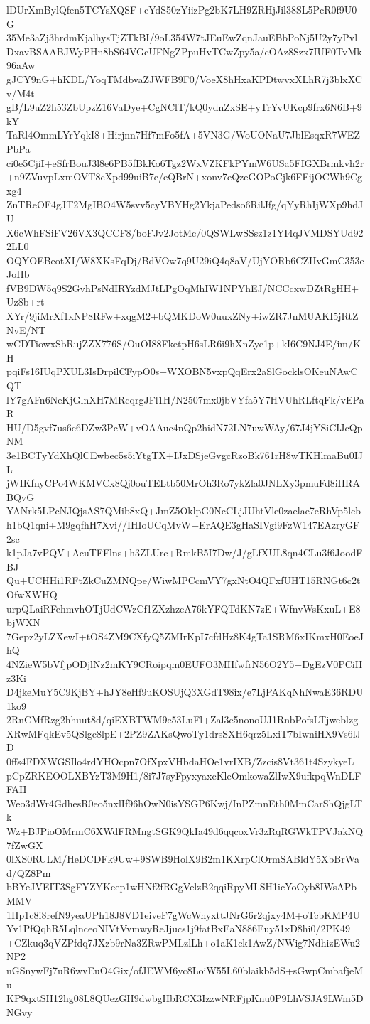 lDUrXmBylQfen5TCYsXQSF+cYdS50zYiizPg2bK7LH9ZRHjJil38SL5PcR0f9U0G
35Me3aZj3hrdmKjalhysTjZTkBI/9oL354W7tJEuEwZqnJauEBbPoNj5U2y7yPvl
DxavBSAABJWyPHn8bS64VGcUFNgZPpuHvTCwZpy5a/cOAz8Szx7IUF0TvMk96aAw
gJCY9nG+hKDL/YoqTMdbvaZJWFB9F0/VoeX8hHxaKPDtwvxXLhR7j3blxXCv/M4t
gB/L9uZ2h53ZbUpzZ16VaDye+CgNClT/kQ0ydnZxSE+yTrYvUKcp9frx6N6B+9kY
TaRl4OmmLYrYqkI8+Hirjnn7Hf7mFo5fA+5VN3G/WoUONaU7JblEsqxR7WEZPbPa
ci0e5CjiI+eSfrBouJ3l8e6PB5fBkKo6Tgz2WxVZKFkPYmW6USa5FIGXBrmkvh2r
+n9ZVuvpLxmOVT8cXpd99uiB7e/eQBrN+xonv7eQzeGOPoCjk6FFijOCWh9Cgxg4
ZnTReOF4gJT2MgIBO4W5svv5cyVBYHg2YkjaPedso6RilJfg/qYyRhIjWXp9hdJU
X6cWhFSiFV26VX3QCCF8/boFJv2JotMc/0QSWLwSSsz1z1YI4qJVMDSYUd922LL0
OQYOEBeotXI/W8XKsFqDj/BdVOw7q9U29iQ4q8aV/UjYORb6CZIIvGmC353eJoHb
fVB9DW5q9S2GvhPsNdIRYzdMJtLPgOqMhIW1NPYhEJ/NCCcxwDZtRgHH+Uz8b+rt
XYr/9jiMrXf1xNP8RFw+xqgM2+bQMKDoW0uuxZNy+iwZR7JnMUAKI5jRtZNvE/NT
wCDTiowxSbRujZZX776S/OuOI88FketpH6sLR6i9hXnZye1p+kI6C9NJ4E/im/KH
pqiFs16IUqPXUL3IsDrpilCFypO0s+WXOBN5vxpQqErx2aSlGocklsOKeuNAwCQT
lY7gAFn6NeKjGlnXH7MRcqrgJFl1H/N2507mx0jbVYfa5Y7HVUhRLftqFk/vEPaR
HU/D5gvf7us6c6DZw3PcW+vOAAuc4nQp2hidN72LN7uwWAy/67J4jYSiCIJcQpNM
3e1BCTyYdXhQlCEwbec5s5iYtgTX+IJxDSjeGvgcRzoBk761rH8wTKHlmaBu0IJL
jWIKfnyCPo4WKMVCx8Qj0ouTELtb50MrOh3Ro7ykZla0JNLXy3pmuFd8iHRABQvG
YANrk5LPcNJQjsAS7QMib8xQ+JmZ5OklpG0NcCLjJUhtVle0zaelae7eRhVp5lcb
h1bQ1qni+M9gqfhH7Xvi//IHIoUCqMvW+ErAQE3gHaSIVgi9FzW147EAzryGF2sc
k1pJa7vPQV+AcuTFFlns+h3ZLUrc+RmkB5I7Dw/J/gLfXUL8qn4CLu3f6JoodFBJ
Qu+UCHHi1RFtZkCuZMNQpe/WiwMPCcmVY7gxNtO4QFxfUHT15RNGt6c2tOfwXWHQ
urpQLaiRFehmvhOTjUdCWzCf1ZXzhzcA76kYFQTdKN7zE+WfnvWsKxuL+E8bjWXN
7Gepz2yLZXewI+tOS4ZM9CXfyQ5ZMIrKpI7cfdHz8K4gTa1SRM6xIKmxH0EoeJhQ
4NZieW5bVfjpODjlNz2mKY9CRoipqm0EUFO3MHfwfrN56O2Y5+DgEzV0PCiHz3Ki
D4jkeMuY5C9KjBY+hJY8eHf9uKOSUjQ3XGdT98ix/e7LjPAKqNhNwaE36RDU1ko9
2RnCMfRzg2hhuut8d/qiEXBTWM9e53LuFl+Zal3e5nonoUJ1RnbPofsLTjweblzg
XRwMFqkEv5QSlgc8lpE+2PZ9ZAKsQwoTy1drsSXH6qrz5LxiT7bIwniHX9Vs6lJD
0ffs4FDXWGSIlo4rdYHOcpn7OfXpxVHbdaHOe1vrIXB/Zzcis8Vt361t4SzykyeL
pCpZRKEOOLXBYzT3M9H1/8i7J7syFpyxyaxcKleOmkowaZlIwX9ufkpqWnDLFFAH
Weo3dWr4GdhesR0eo5nxlIf96hOwN0isYSGP6Kwj/InPZmnEth0MmCarShQjgLTk
Wz+BJPioOMrmC6XWdFRMngtSGK9QkIa49d6qqcoxVr3zRqRGWkTPVJakNQ7fZwGX
0lXS0RULM/HeDCDFk9Uw+9SWB9HolX9B2m1KXrpClOrmSABldY5XbBrWad/QZ8Pm
bBYeJVEIT3SgFYZYKeep1wHNf2fRGgVelzB2qqiRpyMLSH1icYoOyb8IWsAPbMMV
1Hp1c8i8refN9yeaUPh18J8VD1eiveF7gWcWnyxttJNrG6r2qjxy4M+oTcbKMP4U
Yv1PfQqhR5LqlnceoNIVtVvmwyReJjucs1j9fatBxEaN886Euy51xD8hi0/2PK49
+CZkuq3qVZPfdq7JXzb9rNa3ZRwPMLzlLh+o1aK1ck1AwZ/NWig7NdhizEWu2NP2
nGSnywFj7uR6wvEuO4Gix/ofJEWM6yc8LoiW55L60blaikb5dS+sGwpCmbafjeMu
KP9qxtSH12hg08L8QUezGH9dwbgHbRCX3IzzwNRFjpKnu0P9LhVSJA9LWm5DNGvy
